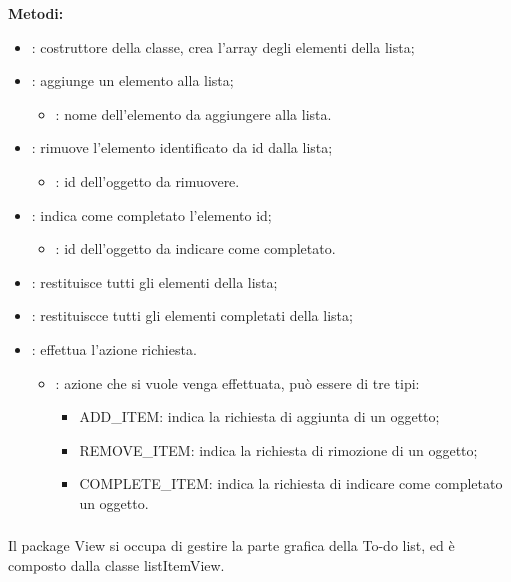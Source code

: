 \textbf{Metodi:}
\begin{itemize}
	\item {}: costruttore della classe, crea l'array degli elementi della lista;
	\item {}: aggiunge un elemento alla lista;
		\begin{itemize}
			\item {}: nome dell'elemento da aggiungere alla lista.
		\end{itemize}
	\item {}: rimuove l'elemento identificato da id dalla lista;
		\begin{itemize}
			\item {}: id dell'oggetto da rimuovere.
		\end{itemize}
	\item {}: indica come completato l'elemento id;
		\begin{itemize}
			\item {}: id dell'oggetto da indicare come completato.
		\end{itemize}
	\item {}: restituisce tutti gli elementi della lista;
	\item {}: restituiscce tutti gli elementi completati della lista;
	\item {}: effettua l'azione richiesta.
		\begin{itemize}
			\item {}: azione che si vuole venga effettuata, può essere di tre tipi:
			\begin{itemize}
				\item ADD\_ITEM: indica la richiesta di aggiunta di un oggetto;
				\item REMOVE\_ITEM: indica la richiesta di rimozione di un oggetto;
				\item COMPLETE\_ITEM: indica la richiesta di indicare come completato un oggetto.
			\end{itemize}
		\end{itemize}
\end{itemize}

\subsubsection[::View]{\class} \label{\class}
Il package View si occupa di gestire la parte grafica della To-do list, ed è composto dalla classe listItemView.

